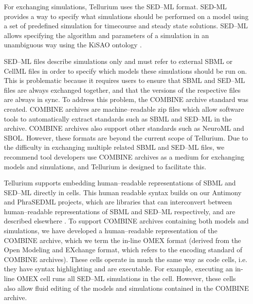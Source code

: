 \documentclass[10pt,letterpaper]{article}
\begin{document}
For exchanging simulations, Tellurium uses the SED--ML format. SED-ML provides a way to specify what simulations should be performed on a model using a set of predefined simulation for timecourse and steady state solutions. SED--ML allows specifying the algorithm and parameters of a simulation in an unambiguous way using the KiSAO ontology \cite{courtot2011controlled}.

SED--ML files describe simulations only and must refer to external SBML or CellML files in order to specify which models these simulations should be run on. This is problematic because it requires users to ensure that SBML and SED--ML files are always exchanged together, and that the versions of the respective files are always in sync. To address this problem, the COMBINE archive standard was created. COMBINE archives are machine--readable zip files which allow software tools to automatically extract standards such as SBML and SED--ML in the archive. COMBINE archives also support other standards such as NeuroML and SBOL. However, these formats are beyond the current scope of Tellurium. Due to the difficulty in exchanging multiple related SBML and SED--ML files, we recommend tool developers use COMBINE archives as a medium for exchanging models and simulations, and Tellurium is designed to facilitate this.


Tellurium supports embedding human--readable representations of SBML \cite{smith2009antimony} and SED--ML \cite{choi2016phrased} directly in cells. This human readable syntax builds on our Antimony and PhraSEDML projects, which are libraries that can interconvert between human--readable representations of SBML and SED--ML respectively, and are described elsewhere \cite{smith2009antimony,choi2016phrased}. To support COMBINE archives containing both models and simulations, we have developed a human--readable representation of the COMBINE archive, which we term the in-line OMEX format (derived from the Open Modeling and EXchange format, which refers to the encoding standard of COMBINE archives). These cells operate in much the same way as code cells, i.e. they have syntax highlighting and are executable. For example, executing an in-line OMEX cell runs all SED--ML simulations in the cell. However, these cells also allow fluid editing of the models and simulations contained in the COMBINE archive.
\end{document}
